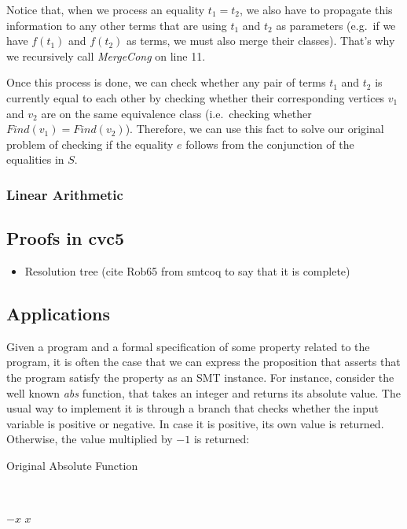 Notice that, when we process an equality $t_{1} = t_{2}$, we also have to propagate this information to any other terms that are using $t_{1}$ and $t_{2}$ as parameters (e.g.~if we have $f(t_{1})$ and $f(t_{2})$ as terms, we must also merge their classes). That's why we recursively call \textit{MergeCong} on line 11.

Once this process is done, we can check whether any pair of terms $t_{1}$ and $t_{2}$ is currently equal to each other by checking whether their corresponding vertices $v_{1}$ and $v_{2}$ are on the same equivalence class (i.e.\ checking whether $Find(v_{1}) = Find(v_{2})$). Therefore, we can use this fact to solve our original problem of checking if the equality $e$ follows from the conjunction of the equalities in $S$.

\subsubsection{Linear Arithmetic}

\subsection{Proofs in cvc5}

\begin{itemize}
  \item Resolution tree (cite Rob65 from smtcoq to say that it is complete)
\end{itemize}

\subsection{Applications}

Given a program and a formal specification of some property related to the program, it is often  the case that we can express the proposition that asserts that the program satisfy the property as an SMT instance. For instance, consider the well known \textit{abs} function, that takes an integer and returns its absolute value. The usual way to implement it is through a branch that checks whether the input variable is positive or negative. In case it is positive, its own value is returned. Otherwise, the value multiplied by $-1$ is returned:

\begin{algorithm}[H]
\caption{Original Absolute Function}~\label{originalAbs}
\begin{algorithmic}[1]
  \State\Return$-x$
\Else
  \State\Return$x$
\EndIf
\EndFunction
\end{algorithmic}
\end{algorithm}

